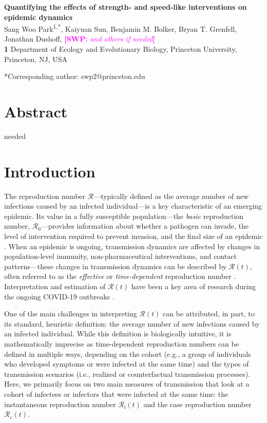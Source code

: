 \documentclass[12pt]{article}
\date{\today}
\newcommand{\comment}{}
\renewcommand{\comment}{\nocomment}
\renewcommand{\comment}{\showcomment}
\newcommand{\showcomment}[3]{\textcolor{#1}{\textbf{[#2: }\textsl{#3}\textbf{]}}}
\newcommand{\nocomment}[3]{}
\newcommand{\swp}[1]{\comment{magenta}{SWP}{#1}}
\newcommand{\Rx}[1]{\ensuremath{{\mathcal R}_{#1}}\xspace}
\newcommand{\Ro}{\Rx{0}}
\newcommand{\Rc}{\Rx{\mathrm{c}}}
\newcommand{\Ri}{\Rx{\mathrm{i}}}
\newcommand{\RR}{\ensuremath{{\mathcal R}}\xspace}
\begin{document}
\begin{flushleft}{
	{\large \textbf{\newline
		Quantifying the effects of strength- and speed-like interventions on epidemic dynamics
	}
	}
}
\newline
\\
Sang Woo Park\textsuperscript{1,*}, Kaiyuan Sun, Benjamin M. Bolker, Bryan T. Grenfell, Jonathan Dushoff, \swp{and others if needed}
\\
\bigskip
\textbf{1} Department of Ecology and Evolutionary Biology, Princeton University, Princeton, NJ, USA
\\
\bigskip

*Corresponding author: swp2@princeton.edu
\end{flushleft}

\section*{Abstract}

needed

\section{Introduction}

The reproduction number \RR---typically defined as the average number of new infections caused by an infected individual---is a key characteristic of an emerging epidemic.
Its value in a fully susceptible population---the \emph{basic} reproduction number, \Ro---provides information about whether a pathogen can invade, the level of intervention required to prevent invasion, and the final size of an epidemic \citep{diekmann1990definition,anderson1991infectious}.
When an epidemic is ongoing, transmission dynamics are affected by changes in population-level immunity, non-pharmaceutical interventions, and contact patterns---these changes in transmission dynamics can be described by $\RR(t)$, often referred to as the \emph{effective} or \emph{time-dependent} reproduction number \citep{wallinga2004different, fraser2007estimating, cori2013new}.
Interpretation and estimation of $\RR(t)$ have been a key area of research during the ongoing COVID-19 outbreaks \citep{pan2020association,flaxman2020estimating,gostic2020practical}.

One of the main challenges in interpreting $\RR(t)$ can be attributed, in part, to its standard, heuristic definition: the average number of new infections caused by an infected individual.
While this definition is biologically intuitive, it is mathematically imprecise as time-dependent reproduction numbers can be defined in multiple ways, depending on the cohort (e.g., a group of individuals who developed symptoms or were infected at the same time) and the types of transmission scenarios (i.e., realized or counterfactual transmission processes).
Here, we primarily focus on two main measures of transmission that look at a cohort of infectees or infectors that were infected at the same time: the instantaneous reproduction number $\Ri(t)$ and the case reproduction number $\Rc(t)$.
\end{document}
